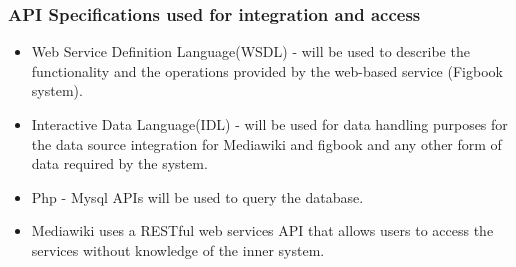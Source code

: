 \subsubsection{API Specifications used for integration and access}
\begin{itemize}
\item Web Service Definition Language(WSDL) - will be used to describe the functionality and the operations provided by the web-based service (Figbook system).
\item Interactive Data Language(IDL) - will be used for data handling purposes for the data source integration for Mediawiki and figbook and any other form of data required by the system.
\item Php - Mysql APIs will be used to query the database.
\item Mediawiki uses a RESTful web services API that allows users to access the services without knowledge of the inner system. 
\end{itemize}


